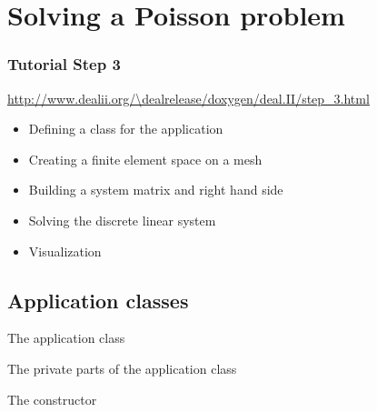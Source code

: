 \section[Poisson]{Solving a Poisson problem}

\begin{frame}
  \frametitle{Tutorial Step 3}
  {\footnotesize{\url{http://www.dealii.org/\dealrelease/doxygen/deal.II/step_3.html}}}
  \begin{itemize}
  \item Defining a class for the application
  \item Creating a finite element space on a mesh
  \item Building a system matrix and right hand side
  \item Solving the discrete linear system
  \item Visualization
  \end{itemize}
\end{frame}

\subsection{Application classes}
\begin{frame}
  \begin{block}{The application class}
    
  \end{block}
\end{frame}

\begin{frame}
  \begin{block}{The private parts of the application class}
        
  \end{block}
\end{frame}

\begin{frame}
  \begin{block}{The constructor}
  
  \end{block}
\end{frame}

